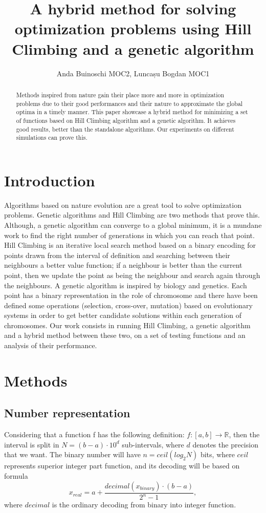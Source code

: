 \documentclass{article}
\title{A hybrid method for solving optimization problems using Hill Climbing and a genetic algorithm}
\author{Anda Buinoschi MOC2, Luncașu Bogdan MOC1 }
\date{}
\begin{document}
\maketitle

\begin{abstract}
Methods inspired from nature gain their place more and more in optimization problems due to their good performances and their nature to approximate the global optima in a timely manner. This paper showcase a hybrid method for minimizing a set of functions based on Hill Climbing algorithm and a genetic algorithm. It achieves good results, better than the standalone algorithms. Our experiments on different simulations can prove this.
\end{abstract}

\section{Introduction}
Algorithms based on nature evolution are a great tool to solve optimization problems. Genetic algorithms and Hill Climbing are two methods that prove this. Although, a genetic algorithm can converge to a global minimum, it is a mundane work to find the right number of generations in which you can reach that point. Hill Climbing is an iterative local search method based on a binary encoding for points drawn from the interval of definition and searching between their neighbours a better value function; if a neighbour is better than the current point, then we update the point as being the neighbour and search again through the neighbours. A genetic algorithm is inspired by biology and genetics. Each point has a binary representation in the role of chromosome and there have been defined some operations (selection, cross-over, mutation) based on evolutionary systems in order to get better candidate solutions within each generation of chromosomes. Our work consists in running Hill Climbing, a genetic algorithm and a hybrid method between these two, on a set of testing functions and an analysis of their performance.

\section{Methods}
\subsection{Number representation}
Considering that a function f has the following definition: $f : [a, b] \rightarrow \mathbb{R}$, then the interval is split in $N = (b - a) \cdot 10 ^d$ sub-intervals, where $d$ denotes the precision that we want. The binary number will have $n = ceil(log_{2}N)$ bits, where $ceil$ represents superior integer part function, and its decoding will be based on formula 
$$x_{real} = a + \frac{decimal(x_{binary}) \cdot (b - a)}{2 ^ n - 1} ,$$ where $decimal$ is the ordinary decoding from binary into integer function.
\end{document}
